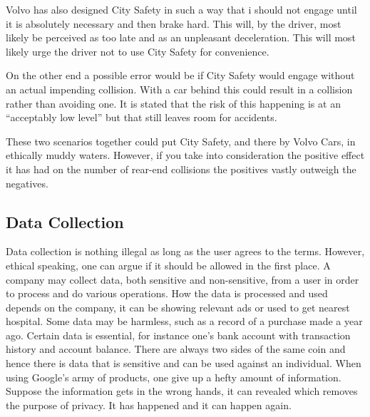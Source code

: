 \documentclass[conference]{IEEEtran}
\begin{document}
Volvo has also designed City Safety in such a way that i should not engage until it is absolutely necessary and then brake hard. This will, by the driver, most likely be perceived as too late and as an unpleasant deceleration. This will most likely urge the driver not to use City Safety for convenience.

On the other end a possible error would be if City Safety would engage without an actual impending collision. With a car behind this could result in a collision rather than avoiding one. It is stated that the risk of this happening is at an ``acceptably low level'' \cite{SysDescription} but that still leaves room for accidents.

These two scenarios together could put City Safety, and there by Volvo Cars, in ethically muddy waters. However, if you take into consideration the positive effect it has had on the number of rear-end collisions \cite{CitySafety} the positives vastly outweigh the negatives.

\subsection{Data Collection}

Data collection is nothing illegal as long as the user agrees to the terms. However, ethical speaking, one can argue if it should be allowed in the first place. A company may collect data, both sensitive and non-sensitive, from a user in order to process and do various operations. How the data is processed and used depends on the company, it can be showing relevant ads or used to get nearest hospital. \cite{GoogleAds,GoogleNearby,GoogleUserData} Some data may be harmless, such as a record of a purchase made a year ago. Certain data is essential, for instance one's bank account with transaction history and account balance. There are always two sides of the same coin and hence there is data that is sensitive and can be used against an individual. When using Google's army of products, one give up a hefty amount of information. \cite{GoogleUserData} Suppose the information gets in the wrong hands, it can revealed which removes the purpose of privacy. It has happened and it can happen again. \cite{TheFappening,EdwardSnowden} 
\end{document}
